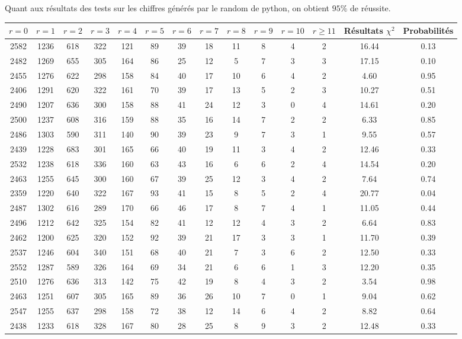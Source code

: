 \documentclass[12pt,a4paper]{article}
\begin{document}
Quant aux résultats des tests sur les chiffres générés par le random de python,
on obtient $95\%$ de réussite.
\begin{center}
\begin{tabular}{|c|c|c|c|c|c|c|c|c|c|c|c|c|c|}
\hline
$r = 0$ & $r = 1$ & $r = 2$ & $r = 3$ & $r = 4$ & $r = 5$ & $r = 6$ & $r = 7$ & $r = 8$ & $r = 9$ & $r = 10$ & $r \geq 11$ & Résultats $\chi^2$ & Probabilités \\ \hline
2582 & 1236 & 618 & 322 & 121 & 89 & 39 & 18 & 11 & 8 & 4 & 2 & 16.44 &  0.13\\ \hline
2482 & 1269 & 655 & 305 & 164 & 86 & 25 & 12 & 5 & 7 & 3 & 3 & 17.15 &  0.10\\ \hline
2455 & 1276 & 622 & 298 & 158 & 84 & 40 & 17 & 10 & 6 & 4 & 2 &  4.60 &  0.95\\ \hline
2406 & 1291 & 620 & 322 & 161 & 70 & 39 & 17 & 13 & 5 & 2 & 3 & 10.27 &  0.51\\ \hline
2490 & 1207 & 636 & 300 & 158 & 88 & 41 & 24 & 12 & 3 & 0 & 4 & 14.61 &  0.20\\ \hline
2500 & 1237 & 608 & 316 & 159 & 88 & 35 & 16 & 14 & 7 & 2 & 2 &  6.33 &  0.85\\ \hline
2486 & 1303 & 590 & 311 & 140 & 90 & 39 & 23 & 9 & 7 & 3 & 1 &  9.55 &  0.57\\ \hline
2439 & 1228 & 683 & 301 & 165 & 66 & 40 & 19 & 11 & 3 & 4 & 2 & 12.46 &  0.33\\ \hline
2532 & 1238 & 618 & 336 & 160 & 63 & 43 & 16 & 6 & 6 & 2 & 4 & 14.54 &  0.20\\ \hline
2463 & 1255 & 645 & 300 & 160 & 67 & 39 & 25 & 12 & 3 & 4 & 2 &  7.64 &  0.74\\ \hline
2359 & 1220 & 640 & 322 & 167 & 93 & 41 & 15 & 8 & 5 & 2 & 4 & 20.77 &  0.04\\ \hline
2487 & 1302 & 616 & 289 & 170 & 66 & 46 & 17 & 8 & 7 & 4 & 1 & 11.05 &  0.44\\ \hline
2496 & 1212 & 642 & 325 & 154 & 82 & 41 & 12 & 12 & 4 & 3 & 2 &  6.64 &  0.83\\ \hline
2462 & 1200 & 625 & 320 & 152 & 92 & 39 & 21 & 17 & 3 & 3 & 1 & 11.70 &  0.39\\ \hline
2537 & 1246 & 604 & 340 & 151 & 68 & 40 & 21 & 7 & 3 & 6 & 2 & 12.50 &  0.33\\ \hline
2552 & 1287 & 589 & 326 & 164 & 69 & 34 & 21 & 6 & 6 & 1 & 3 & 12.20 &  0.35\\ \hline
2510 & 1276 & 636 & 313 & 142 & 75 & 42 & 19 & 8 & 4 & 3 & 2 &  3.54 &  0.98\\ \hline
2463 & 1251 & 607 & 305 & 165 & 89 & 36 & 26 & 10 & 7 & 0 & 1 &  9.04 &  0.62\\ \hline
2547 & 1255 & 637 & 298 & 158 & 72 & 38 & 12 & 14 & 6 & 4 & 2 &  8.82 &  0.64\\ \hline
2438 & 1233 & 618 & 328 & 167 & 80 & 28 & 25 & 8 & 9 & 3 & 2 & 12.48 &  0.33\\ \hline
\end{tabular}
\end{center}
\end{document}
